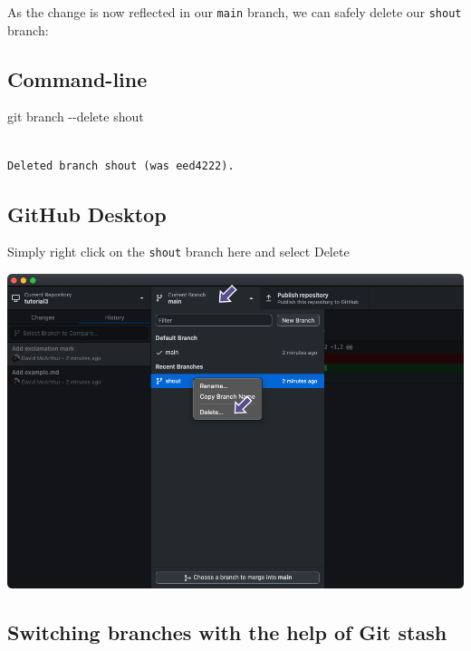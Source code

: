\documentclass[
  letterpaper,
  DIV=11,
  numbers=noendperiod]{scrartcl}
\newenvironment{Shaded}{\begin{snugshade}}{\end{snugshade}}
\newcommand{\AttributeTok}[1]{\textcolor[rgb]{0.40,0.45,0.13}{#1}}
\newcommand{\FunctionTok}[1]{\textcolor[rgb]{0.28,0.35,0.67}{#1}}
\newcommand{\NormalTok}[1]{\textcolor[rgb]{0.00,0.23,0.31}{#1}}
\begin{document}
As the change is now reflected in our \texttt{main} branch, we can
safely delete our \texttt{shout} branch:

\subsection{Command-line}

\begin{Shaded}
\begin{Highlighting}[]
\FunctionTok{git}\NormalTok{ branch }\AttributeTok{{-}{-}delete}\NormalTok{ shout}
\end{Highlighting}
\end{Shaded}

\begin{verbatim}

Deleted branch shout (was eed4222).
\end{verbatim}

\subsection{GitHub Desktop}

Simply right click on the \texttt{shout} branch here and select Delete

\includegraphics{images/image36.png}

\hypertarget{switching-branches-with-the-help-of-git-stash}{%
\subsection{Switching branches with the help of Git
stash}\label{switching-branches-with-the-help-of-git-stash}}
\end{document}
